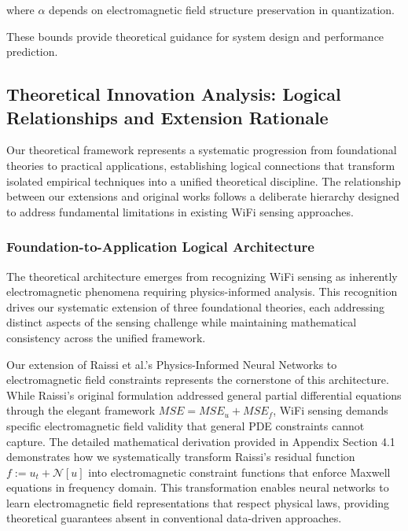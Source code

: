 \documentclass[journal]{IEEEtran}
\begin{document}
where $\alpha$ depends on electromagnetic field structure preservation in quantization.

These bounds provide theoretical guidance for system design and performance prediction.

\subsection{Theoretical Innovation Analysis: Logical Relationships and Extension Rationale}
\label{sec:theoretical_innovation_analysis}

Our theoretical framework represents a systematic progression from foundational theories to practical applications, establishing logical connections that transform isolated empirical techniques into a unified theoretical discipline. The relationship between our extensions and original works follows a deliberate hierarchy designed to address fundamental limitations in existing WiFi sensing approaches.

\subsubsection{Foundation-to-Application Logical Architecture}

The theoretical architecture emerges from recognizing WiFi sensing as inherently electromagnetic phenomena requiring physics-informed analysis. This recognition drives our systematic extension of three foundational theories, each addressing distinct aspects of the sensing challenge while maintaining mathematical consistency across the unified framework.

Our extension of Raissi et al.'s Physics-Informed Neural Networks to electromagnetic field constraints represents the cornerstone of this architecture. While Raissi's original formulation addressed general partial differential equations through the elegant framework $MSE = MSE_u + MSE_f$, WiFi sensing demands specific electromagnetic field validity that general PDE constraints cannot capture. The detailed mathematical derivation provided in Appendix Section 4.1 demonstrates how we systematically transform Raissi's residual function $f := u_t + \mathcal{N}[u]$ into electromagnetic constraint functions that enforce Maxwell equations in frequency domain. This transformation enables neural networks to learn electromagnetic field representations that respect physical laws, providing theoretical guarantees absent in conventional data-driven approaches.
\end{document}
